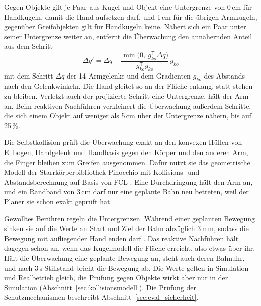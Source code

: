 Gegen Objekte gilt je Paar aus Kugel und Objekt eine Untergrenze von 0\,cm für Handkugeln, damit die Hand aufsetzen darf, und 1\,cm für die übrigen Armkugeln, gegenüber Greifobjekten gilt für Handkugeln keine.
Nähert sich ein Paar unter seiner Untergrenze weiter an, entfernt die Überwachung den annähernden Anteil aus dem Schritt
\begin{equation}
  \Delta q' = \Delta q - \frac{\min\bigl(0,\ g_{ko}^\mathsf{T}\Delta q\bigr)}{g_{ko}^\mathsf{T} g_{ko}}\, g_{ko}
  \label{eq:projektion}
\end{equation}
%
mit dem Schritt $\Delta q$ der 14 Armgelenke und dem Gradienten $g_{ko}$ des Abstands nach den Gelenkwinkeln.
Die Hand gleitet so an der Fläche entlang, statt stehen zu bleiben.
Verletzt auch der projizierte Schritt eine Untergrenze, hält der Arm an.
Beim reaktiven Nachführen verkleinert die Überwachung außerdem Schritte, die sich einem Objekt auf weniger als 5\,cm über der Untergrenze nähern, bis auf 25\,\%.

Die Selbstkollision prüft die Überwachung exakt an den konvexen Hüllen von Ellbogen, Handgelenk und Handbasis gegen den Körper und den anderen Arm, die Finger bleiben zum Greifen ausgenommen.
Dafür nutzt sie das geometrische Modell der Starrkörperbibliothek Pinocchio mit Kollisions- und Abstandsberechnung auf Basis von FCL \cite{Carpentier2019}.
Eine Durchdringung hält den Arm an, und ein Randband von 3\,cm darf nur eine geplante Bahn neu betreten, weil der Planer sie schon exakt geprüft hat.

Gewolltes Berühren regeln die Untergrenzen.
Während einer geplanten Bewegung sinken sie auf die Werte an Start und Ziel der Bahn abzüglich 3\,mm, sodass die Bewegung mit aufliegender Hand enden darf .
Das reaktive Nachführen hält dagegen schon an, wenn das Kugelmodell die Fläche erreicht, also etwas über ihr.
Hält die Überwachung eine geplante Bewegung an, steht auch deren Bahnuhr, und nach 3\,s Stillstand bricht die Bewegung ab.
Die Werte gelten in Simulation und Realbetrieb gleich, die Prüfung gegen Objekte wirkt aber nur in der Simulation (Abschnitt~\ref{sec:kollisionsmodell}).
Die Prüfung der Schutzmechanismen beschreibt Abschnitt~\ref{sec:eval_sicherheit}.

